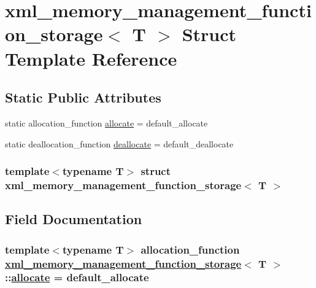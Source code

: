 \hypertarget{structxml__memory__management__function__storage}{
\section{xml\_\-memory\_\-management\_\-function\_\-storage$<$ T $>$ Struct Template Reference}
\label{structxml__memory__management__function__storage}
}
\subsection*{Static Public Attributes}
\begin{CompactItemize}
\item 
static allocation\_\-function \hyperlink{structxml__memory__management__function__storage_bb6865f8d07d27fd9273737c59f6e941}{allocate} = default\_\-allocate
\item 
static deallocation\_\-function \hyperlink{structxml__memory__management__function__storage_1c80a9a045ed6cfb90b17a178e4b3512}{deallocate} = default\_\-deallocate
\end{CompactItemize}
\subsubsection*{template$<$typename T$>$ struct xml\_\-memory\_\-management\_\-function\_\-storage$<$ T $>$}



\subsection{Field Documentation}
\hypertarget{structxml__memory__management__function__storage_bb6865f8d07d27fd9273737c59f6e941}{
\subsubsection[allocate]{\setlength{\rightskip}{0pt plus 5cm}template$<$typename T$>$ allocation\_\-function \hyperlink{structxml__memory__management__function__storage}{xml\_\-memory\_\-management\_\-function\_\-storage}$<$ T $>$::\hyperlink{structxml__memory__management__function__storage_bb6865f8d07d27fd9273737c59f6e941}{allocate} = default\_\-allocate}}
\label{structxml__memory__management__function__storage_bb6865f8d07d27fd9273737c59f6e941}


